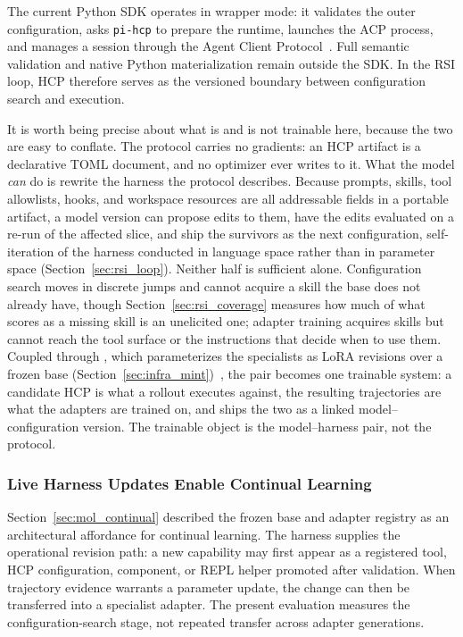 The current Python SDK operates in wrapper mode: it validates the outer configuration, asks \texttt{pi-hcp} to prepare the runtime, launches the ACP process, and manages a session through the Agent Client Protocol~\citep{hcp_sdk2026}. Full semantic validation and native Python materialization remain outside the SDK. In the RSI loop, HCP therefore serves as the versioned boundary between configuration search and execution.

It is worth being precise about what is and is not trainable here, because the two are easy to conflate. The protocol carries no gradients: an HCP artifact is a declarative TOML document, and no optimizer ever writes to it. What the model \emph{can} do is rewrite the harness the protocol describes. Because prompts, skills, tool allowlists, hooks, and workspace resources are all addressable fields in a portable artifact, a model version can propose edits to them, have the edits evaluated on a re-run of the affected slice, and ship the survivors as the next configuration, self-iteration of the harness conducted in language space rather than in parameter space (Section~\ref{sec:rsi_loop}). Neither half is sufficient alone. Configuration search moves in discrete jumps and cannot acquire a skill the base does not already have, though Section~\ref{sec:rsi_coverage} measures how much of what scores as a missing skill is an unelicited one; adapter training acquires skills but cannot reach the tool surface or the instructions that decide when to use them. Coupled through \mint{}, which parameterizes the specialists as LoRA revisions over a frozen base (Section~\ref{sec:infra_mint})~\citep{lu2026announcing}, the pair becomes one trainable system: a candidate HCP is what a rollout executes against, the resulting trajectories are what the adapters are trained on, and \mindforge{} ships the two as a linked model--configuration version. The trainable object is the model--harness pair, not the protocol.

\subsubsection{Live Harness Updates Enable Continual Learning}
\label{sec:harness_live}

Section~\ref{sec:mol_continual} described the frozen base and adapter registry as
an architectural affordance for continual learning. The harness supplies the
operational revision path: a new capability may first appear as a registered
tool, HCP configuration, \uifora{} component, or REPL helper promoted after
validation. When trajectory evidence warrants a parameter update, the change can
then be transferred into a specialist adapter. The present evaluation measures
the configuration-search stage, not repeated transfer across adapter generations.

